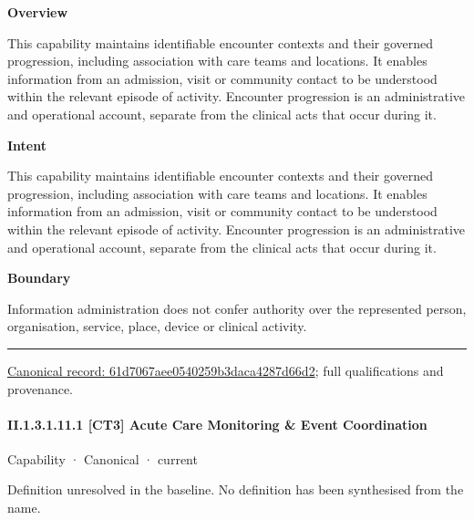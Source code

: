 \textbf{Overview}



This capability maintains identifiable encounter contexts and their governed progression, including association with care teams and locations. It enables information from an admission, visit or community contact to be understood within the relevant episode of activity. Encounter progression is an administrative and operational account, separate from the clinical acts that occur during it.



\textbf{Intent}



This capability maintains identifiable encounter contexts and their governed progression, including association with care teams and locations. It enables information from an admission, visit or community contact to be understood within the relevant episode of activity. Encounter progression is an administrative and operational account, separate from the clinical acts that occur during it.



\textbf{Boundary}



Information administration does not confer authority over the represented person, organisation, service, place, device or clinical activity.



\medskip\hrule\medskip

{\footnotesize \href{../../../../continuum/strategy/capability/61d7067aee0540259b3daca4287d66d2.md}{Canonical record: 61d7067aee0540259b3daca4287d66d2}; full qualifications and provenance.}\par
\paragraph*{II.1.3.1.11.1 [CT3] Acute Care Monitoring \& Event Coordination}
\label{navigation:II.1.3.1.11.1}

\label{element:ee17b26b8c874cc3af50d07a787ce488}
{\small Capability · Canonical · current}\par

Definition unresolved in the baseline. No definition has been synthesised from the name.



